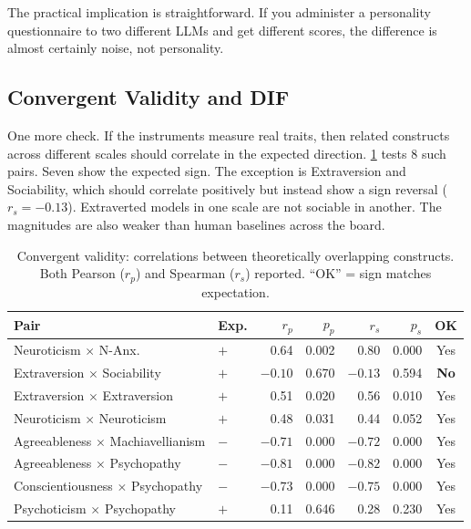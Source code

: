 \documentclass[11pt]{article}
\begin{document}
The practical implication is straightforward. If you administer a personality questionnaire to two different LLMs and get different scores, the difference is almost certainly noise, not personality.

\subsection{Convergent Validity and DIF}

One more check. If the instruments measure real traits, then related constructs across different scales should correlate in the expected direction. \cref{tab:convergent} tests 8 such pairs. Seven show the expected sign. The exception is Extraversion and Sociability, which should correlate positively but instead show a sign reversal ($r_s = -0.13$). Extraverted models in one scale are not sociable in another. The magnitudes are also weaker than human baselines across the board.

\begin{table}[t]
\centering
\small
\caption{Convergent validity: correlations between theoretically overlapping constructs. Both Pearson ($r_p$) and Spearman ($r_s$) reported. ``OK'' = sign matches expectation.}
\label{tab:convergent}
\begin{tabular}{llrrrrc}
\toprule
Pair & Exp. & $r_p$ & $p_p$ & $r_s$ & $p_s$ & OK \\
\midrule
Neuroticism $\times$ N-Anx. & $+$ & 0.64 & 0.002 & 0.80 & 0.000 & Yes \\
Extraversion $\times$ Sociability & $+$ & $-0.10$ & 0.670 & $-0.13$ & 0.594 & \textbf{No} \\
Extraversion $\times$ Extraversion & $+$ & 0.51 & 0.020 & 0.56 & 0.010 & Yes \\
Neuroticism $\times$ Neuroticism & $+$ & 0.48 & 0.031 & 0.44 & 0.052 & Yes \\
Agreeableness $\times$ Machiavellianism & $-$ & $-0.71$ & 0.000 & $-0.72$ & 0.000 & Yes \\
Agreeableness $\times$ Psychopathy & $-$ & $-0.81$ & 0.000 & $-0.82$ & 0.000 & Yes \\
Conscientiousness $\times$ Psychopathy & $-$ & $-0.73$ & 0.000 & $-0.75$ & 0.000 & Yes \\
Psychoticism $\times$ Psychopathy & $+$ & 0.11 & 0.646 & 0.28 & 0.230 & Yes \\
\bottomrule
\end{tabular}
\end{table}
\end{document}
